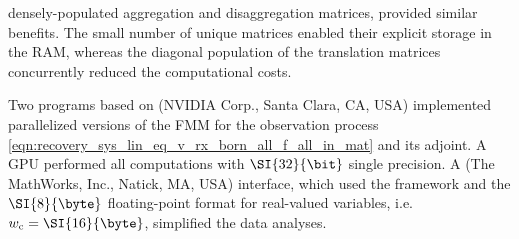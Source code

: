 densely-populated aggregation and
disaggregation matrices, provided
similar benefits.
The small number of
unique matrices enabled
their explicit storage in
the \ac{RAM}, whereas
the diagonal population of
the translation matrices concurrently reduced
the computational costs.


Two  programs based on
(NVIDIA Corp., Santa Clara, CA, USA) implemented
parallelized versions of
the \ac{FMM} for
the observation process
\eqref{eqn:recovery_sys_lin_eq_v_rx_born_all_f_all_in_mat} and
its adjoint.
A  \ac{GPU} performed
all computations with
$\SI{32}{\bit}$ single precision. %
A 
(The MathWorks, Inc., Natick, MA, USA) interface, which used
the  framework and
the $\SI{8}{\byte}$ floating-point format for
real-valued variables, i.e.
$w_{\text{c}} = \SI{16}{\byte}$, simplified
the data analyses. %
